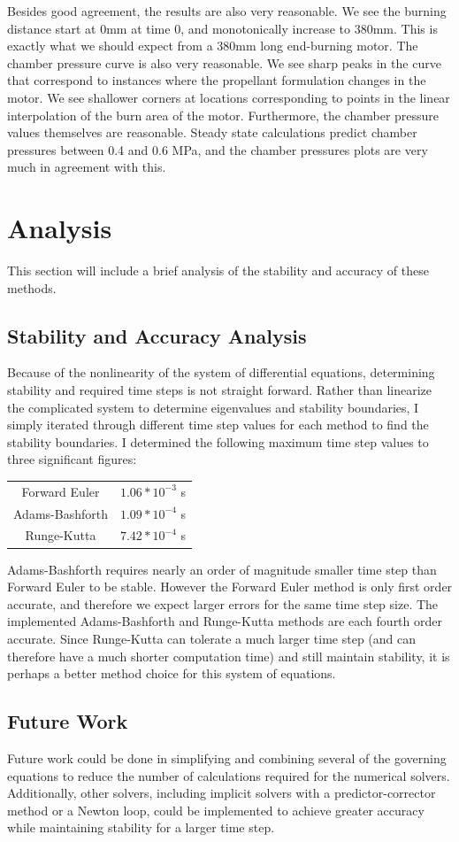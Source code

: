 \documentclass[12pt, letterpaper]{article}
\begin{document}
Besides good agreement, the results are also very reasonable. We see the burning distance start at 0mm at time 0, and monotonically increase to 380mm. This is exactly what we should expect from a 380mm long end-burning motor. The chamber pressure curve is also very reasonable. We see sharp peaks in the curve that correspond to instances where the propellant formulation changes in the motor. We see shallower corners at locations corresponding to points in the linear interpolation of the burn area of the motor. Furthermore, the chamber pressure values themselves are reasonable. Steady state calculations predict chamber pressures between 0.4 and 0.6 MPa, and the chamber pressures plots are very much in agreement with this. 

\section{Analysis}

This section will include a brief analysis of the stability and accuracy of these methods. 

\subsection{Stability and Accuracy Analysis} 

Because of the nonlinearity of the system of differential equations, determining stability and required time steps is not straight forward. Rather than linearize the complicated system to determine eigenvalues and stability boundaries, I simply iterated through different time step values for each method to find the stability boundaries. I determined the following maximum time step values to three significant figures: 

\begin{tabular}{ c c }
 Forward Euler & $1.06*10^{-3}$ s \\ 
 Adams-Bashforth & $1.09*10^{-4}$ s \\  
 Runge-Kutta & $7.42*10^{-4}$ s    
\end{tabular}

Adams-Bashforth requires nearly an order of magnitude smaller time step than Forward Euler to be stable. However the Forward Euler method is only first order accurate, and therefore we expect larger errors for the same time step size. The implemented Adams-Bashforth and Runge-Kutta methods are each fourth order accurate. Since Runge-Kutta can tolerate a much larger time step (and can therefore have a much shorter computation time) and still maintain stability, it is perhaps a better method choice for this system of equations. 

\subsection{Future Work} 

Future work could be done in simplifying and combining several of the governing equations to reduce the number of calculations required for the numerical solvers. Additionally, other solvers, including implicit solvers with a predictor-corrector method or a Newton loop, could be implemented to achieve greater accuracy while maintaining stability for a larger time step. 
 
\end{document}
